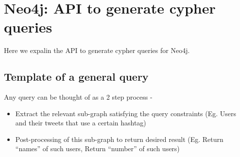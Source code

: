 \documentclass[letterpaper,10pt,english]{sphinxmanual}
\begin{document}

\begin{fulllineitems}
\label{\detokenize{mongoDB_data_ingestion:ingest_raw.getDateFromTimestamp}}
\end{fulllineitems}


\begin{fulllineitems}
\label{\detokenize{mongoDB_data_ingestion:ingest_raw.read_tweets}}
\end{fulllineitems}


\begin{fulllineitems}
\label{\detokenize{mongoDB_data_ingestion:ingest_raw.threaded}}
\end{fulllineitems}



\chapter{Neo4j: API to generate cypher queries}
\label{\detokenize{neo4j_query_generation:neo4j-api-to-generate-cypher-queries}}\label{\detokenize{neo4j_query_generation::doc}}
Here we expalin the API to generate cypher queries for Neo4j.


\section{Template of a general query}
\label{\detokenize{neo4j_query_generation:template-of-a-general-query}}
Any query can be thought of as a 2 step process -
\begin{itemize}
\item {} 
Extract the relevant sub-graph satisfying the query constraints (Eg. Users and their tweets that use a certain hashtag)

\item {} 
Post-processing of this sub-graph to return desired result (Eg. Return “names” of such users, Return “number” of such users)

\end{itemize}
\end{document}
